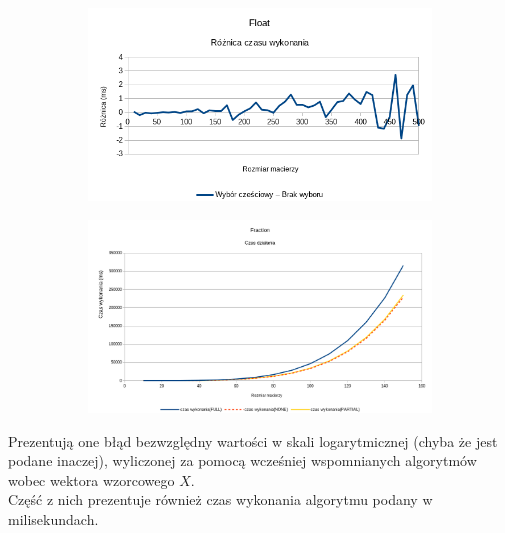\documentclass[10pt]{article}
\begin{document}
\begin{figure}[h]
	\begin{subfigure}{0.5\textwidth}
		\includegraphics[width=\textwidth]{float_roznica_czas.png}
		\caption{ \label{Rys1c}}
	\end{subfigure}
	\hfill
	\begin{subfigure}{0.5\textwidth}
		\includegraphics[width=\textwidth]{fraction_czas.png}
		\caption{ \label{Rys1d}}
	\end{subfigure}
\end{figure}
Prezentują one błąd bezwzględny wartości w skali logarytmicznej (chyba że jest podane inaczej), wyliczonej za pomocą wcześniej wspomnianych algorytmów wobec wektora wzorcowego $X$.\\
Część z nich prezentuje również czas wykonania algorytmu podany w milisekundach.
\end{document}
